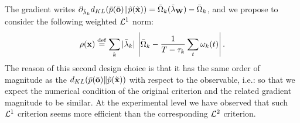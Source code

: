 The gradient writes $\partial_{\tilde{\lambda}_k} d_{KL}(\bar{p}(\bar{\bf o})\|\tilde{p}(\tilde{\bf x})) = \tilde{\Omega}_{k}(\tilde{\bf \lambda}_{\bf W}) - \bar{\Omega}_{k}$, and we propose to consider the following weighted ${\cal L}^1$ norm:
\begin{equation} \label{kl-criterion} \rho({\bf x}) \stackrel {\rm def}{=} \sum_k |\bar{\lambda}_k| \, \left|\bar{\Omega}_{k} - \frac{1}{T-\tau_k} \sum_t \omega_k(t)\right|. \end{equation}
The reason of this second design choice is that it has the same order of magnitude as the $d_{KL}(\bar{p}(\bar{\bf o})\|\tilde{p}(\tilde{\bf x}))$ with respect to the observable, i.e.:
so that we expect the numerical condition of the original criterion and the related gradient magnitude to be similar. At the experimental level we have observed that such ${\cal L}^1$ criterion seems more efficient than the corresponding ${\cal L}^2$ criterion.
